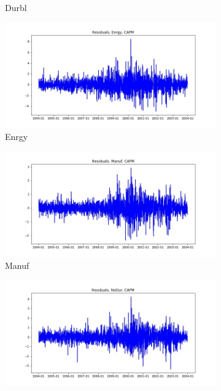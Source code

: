 \documentclass{article}
\begin{document}
\begin{figure}
\begin{subfigure}[b]{0.5\textwidth}
    \caption{Durbl}
    \label{fig:2}
  \end{subfigure}
  \begin{subfigure}[b]{0.5\textwidth}
    \centering
    \includegraphics[width=\textwidth]{Enrgy/resid_ts_CAPM.jpg}
    \caption{Enrgy}
    \label{fig:2}
  \end{subfigure}
  \begin{subfigure}[b]{0.5\textwidth}
    \centering
    \includegraphics[width=\textwidth]{Manuf/resid_ts_CAPM.jpg}
    \caption{Manuf}
    \label{fig:2}
  \end{subfigure}
  \begin{subfigure}[b]{0.5\textwidth}
    \centering
    \includegraphics[width=\textwidth]{NoDur/resid_ts_CAPM.jpg}

\end{subfigure}
\end{figure}
\end{document}
